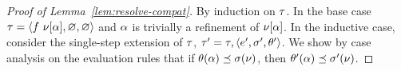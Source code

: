 \begin{proof}[Proof of Lemma~\ref{lem:resolve-compat}]
  By induction on $\tau$.
  In the base case $\tau = \langle f\ \nu[\alpha], \varnothing, \varnothing \rangle$
  and $\alpha$ is trivially a refinement of $\nu[\alpha]$.
  In the inductive case, consider the single-step extension of $\tau$,
  $\tau' = \tau,\langle e', \sigma', \theta' \rangle$.
  We show by case analysis on the evaluation rules that if
  ${\theta(\alpha)} \preceq {\ensuremath{\sigma(\nu)}}$, then
  ${\theta'(\alpha)} \preceq {\ensuremath{\sigma'(\nu)}}$.


\end{proof}
